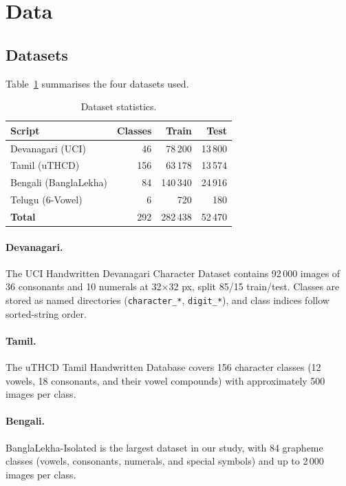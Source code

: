 \documentclass[10pt,twocolumn]{article}
\begin{document}
\section{Data}

\subsection{Datasets}

Table~\ref{tab:datasets} summarises the four datasets used.

\begin{table}[H]
\centering
\caption{Dataset statistics.}
\label{tab:datasets}
\small
\begin{tabular}{lrrr}
\toprule
Script & Classes & Train & Test \\
\midrule
Devanagari (UCI) & 46 & 78\,200 & 13\,800 \\
Tamil (uTHCD)    & 156 & 63\,178 & 13\,574 \\
Bengali (BanglaLekha) & 84 & 140\,340 & 24\,916 \\
Telugu (6-Vowel) & 6  & 720 & 180 \\
\midrule
\textbf{Total}   & 292 & 282\,438 & 52\,470 \\
\bottomrule
\end{tabular}
\end{table}

\paragraph{Devanagari.}
The UCI Handwritten Devanagari Character Dataset \cite{acharya2015} contains
92\,000 images of 36 consonants and 10 numerals at 32$\times$32 px, split 85/15
train/test.  Classes are stored as named directories (\texttt{character\_*},
\texttt{digit\_*}), and class indices follow sorted-string order.

\paragraph{Tamil.}
The uTHCD Tamil Handwritten Database \cite{uthcd} covers 156 character classes
(12 vowels, 18 consonants, and their vowel compounds) with approximately 500
images per class.

\paragraph{Bengali.}
BanglaLekha-Isolated \cite{banglalekha} is the largest dataset in our study,
with 84 grapheme classes (vowels, consonants, numerals, and special symbols)
and up to 2\,000 images per class.
\end{document}

